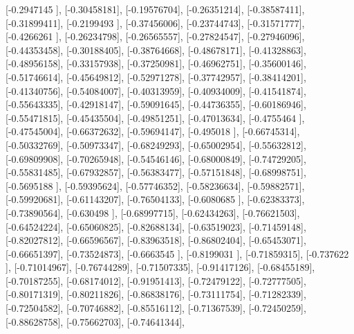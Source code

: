\documentclass{article}
\begin{document}
       [-0.2947145 ],
       [-0.30458181],
       [-0.19576704],
       [-0.26351214],
       [-0.38587411],
       [-0.31899411],
       [-0.2199493 ],
       [-0.37456006],
       [-0.23744743],
       [-0.31571777],
       [-0.4266261 ],
       [-0.26234798],
       [-0.26565557],
       [-0.27824547],
       [-0.27946096],
       [-0.44353458],
       [-0.30188405],
       [-0.38764668],
       [-0.48678171],
       [-0.41328863],
       [-0.48956158],
       [-0.33157938],
       [-0.37250981],
       [-0.46962751],
       [-0.35600146],
       [-0.51746614],
       [-0.45649812],
       [-0.52971278],
       [-0.37742957],
       [-0.38414201],
       [-0.41340756],
       [-0.54084007],
       [-0.40313959],
       [-0.40934009],
       [-0.41541874],
       [-0.55643335],
       [-0.42918147],
       [-0.59091645],
       [-0.44736355],
       [-0.60186946],
       [-0.55471815],
       [-0.45435504],
       [-0.49851251],
       [-0.47013634],
       [-0.4755464 ],
       [-0.47545004],
       [-0.66372632],
       [-0.59694147],
       [-0.495018  ],
       [-0.66745314],
       [-0.50332769],
       [-0.50973347],
       [-0.68249293],
       [-0.65002954],
       [-0.55632812],
       [-0.69809908],
       [-0.70265948],
       [-0.54546146],
       [-0.68000849],
       [-0.74729205],
       [-0.55831485],
       [-0.67932857],
       [-0.56383477],
       [-0.57151848],
       [-0.68998751],
       [-0.5695188 ],
       [-0.59395624],
       [-0.57746352],
       [-0.58236634],
       [-0.59882571],
       [-0.59920681],
       [-0.61143207],
       [-0.76504133],
       [-0.6080685 ],
       [-0.62383373],
       [-0.73890564],
       [-0.630498  ],
       [-0.68997715],
       [-0.62434263],
       [-0.76621503],
       [-0.64524224],
       [-0.65060825],
       [-0.82688134],
       [-0.63519023],
       [-0.71459148],
       [-0.82027812],
       [-0.66596567],
       [-0.83963518],
       [-0.86802404],
       [-0.65453071],
       [-0.66651397],
       [-0.73524873],
       [-0.6663545 ],
       [-0.8199031 ],
       [-0.71859315],
       [-0.737622  ],
       [-0.71014967],
       [-0.76744289],
       [-0.71507335],
       [-0.91417126],
       [-0.68455189],
       [-0.70187255],
       [-0.68174012],
       [-0.91951413],
       [-0.72479122],
       [-0.72777505],
       [-0.80171319],
       [-0.80211826],
       [-0.86838176],
       [-0.73111754],
       [-0.71282339],
       [-0.72504582],
       [-0.70746882],
       [-0.85516112],
       [-0.71367539],
       [-0.72450259],
       [-0.88628758],
       [-0.75662703],
       [-0.74641344],
\end{document}
